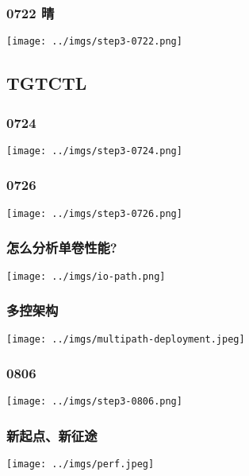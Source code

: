 \documentclass[UTF8,8pt,xcolor=dvipsnames]{beamer}
\begin{document}
\begin{frame}[fragile]
    \frametitle{0722 晴}
    \begin{center}
        \texttt{[image: ../imgs/step3-0722.png]}
    \end{center}
\end{frame}

\subsection{TGTCTL}

\begin{frame}[fragile]
    \frametitle{0724}
    \begin{center}
        \texttt{[image: ../imgs/step3-0724.png]}
    \end{center}
\end{frame}

\begin{frame}[fragile]
    \frametitle{0726}
    \begin{center}
        \texttt{[image: ../imgs/step3-0726.png]}
    \end{center}
\end{frame}

\begin{frame}[fragile]
    \frametitle{怎么分析单卷性能?}
    \begin{center}
        \texttt{[image: ../imgs/io-path.png]}
    \end{center}
\end{frame}

\begin{frame}[fragile]
    \frametitle{多控架构}
    \begin{center}
        \texttt{[image: ../imgs/multipath-deployment.jpeg]}
    \end{center}
\end{frame}

\begin{frame}[fragile]
    \frametitle{0806}
    \begin{center}
        \texttt{[image: ../imgs/step3-0806.png]}
    \end{center}
\end{frame}

\begin{frame}[fragile]
    \frametitle{新起点、新征途}
    \begin{center}
        \texttt{[image: ../imgs/perf.jpeg]}
    \end{center}
\end{frame}
\end{document}
